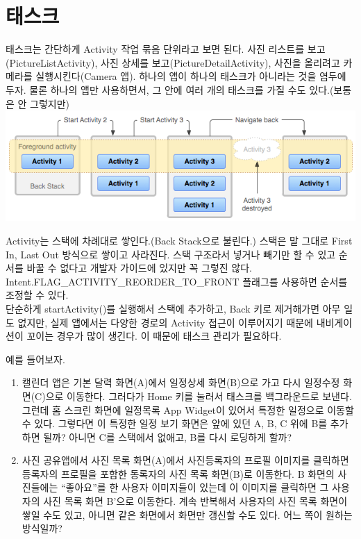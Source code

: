 \section{태스크}
태스크는 간단하게 Activity 작업 묶음 단위라고 보면 된다. 사진 리스트를 보고(PictureListActivity), 사진 상세를 보고(PictureDetailActivity), 사진을 올리려고 카메라를 실행시킨다(Camera 앱).
하나의 앱이 하나의 태스크가 아니라는 것을 염두에 두자. 물론 하나의 앱만 사용하면서, 그 안에 여러 개의 태스크를 가질 수도 있다.(보통은 안 그렇지만)\\
\includegraphics[scale=0.6]{diagram_backstack}

Activity는 스택에 차례대로 쌓인다.(Back Stack으로 불린다.) 스택은 말 그대로 First In, Last Out 방식으로 쌓이고 사라진다. 스택 구조라서 넣거나 빼기만 할 수 있고 순서를 바꿀 수 없다고 개발자 가이드에 있지만 꼭 그렇진 않다. Intent.FLAG\_ACTIVITY\_REORDER\_TO\_FRONT 플래그를 사용하면 순서를 조정할 수 있다.\\

단순하게 startActivity()를 실행해서 스택에 추가하고, Back 키로 제거해가면 아무 일도 없지만, 실제 앱에서는 다양한 경로의 Activity 접근이 이루어지기 때문에 내비게이션이 꼬이는 경우가 많이 생긴다. 이 때문에 태스크 관리가 필요하다.

예를 들어보자. 
\begin{enumerate}
\item 캘린더 앱은 기본 달력 화면(A)에서 일정상세 화면(B)으로 가고 다시 일정수정 화면(C)으로 이동한다. 그러다가 Home 키를 눌러서 태스크를 백그라운드로 보낸다. 
그런데 홈 스크린 화면에 일정목록 App Widget이 있어서 특정한 일정으로 이동할 수 있다. 그렇다면 이 특정한 일정 보기 화면은 앞에 있던 A, B, C 위에 B를 추가하면 될까? 아니면 C를 스택에서 없애고, B를 다시 로딩하게 할까?
\item 사진 공유앱에서 사진 목록 화면(A)에서 사진등록자의 프로필 이미지를 클릭하면 등록자의 프로필을 포함한 동록자의 사진 목록 화면(B)로 이동한다. B 화면의 사진들에는 ``좋아요''를 한 사용자 이미지들이 있는데 이 이미지를 클릭하면 그 사용자의 사진 목록 화면 B'으로 이동한다. 계속 반복해서 사용자의 사진 목록 화면이 쌓일 수도 있고, 아니면 같은 화면에서 화면만 갱신할 수도 있다. 어느 쪽이 원하는 방식일까?
\end{enumerate}

